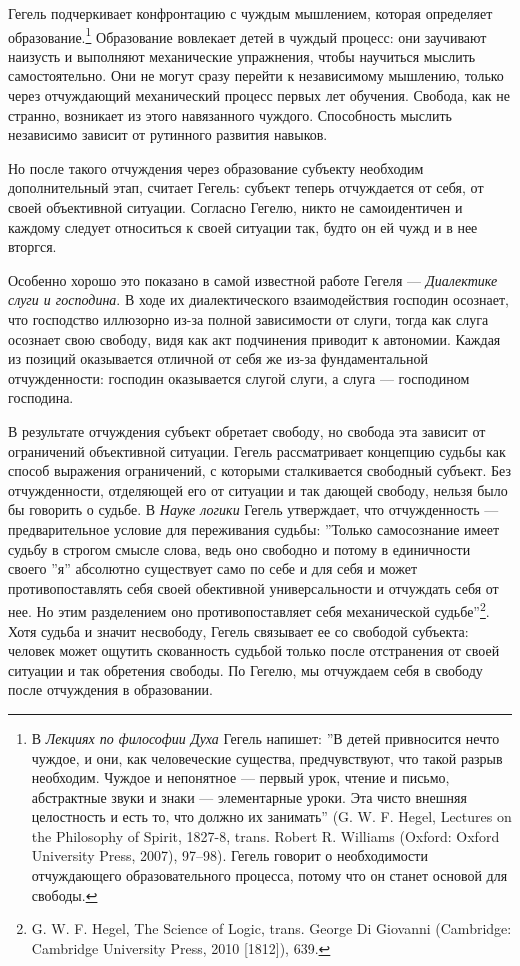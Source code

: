 \documentclass[12pt]{book}
\begin{document}
Гегель подчеркивает конфронтацию с чуждым мышлением, которая определяет образование.\footnote{В \textit{Лекциях по философии Духа} Гегель напишет: ''В детей привносится нечто чуждое, и они, как человеческие существа, предчувствуют, что такой разрыв необходим. Чуждое и непонятное --- первый урок, чтение и письмо, абстрактные звуки и знаки --- элементарные уроки. Эта чисто внешняя целостность и есть то, что должно их занимать'' (G. W. F. Hegel, Lectures on the Philosophy of Spirit, 1827-8, trans. Robert R. Williams (Oxford: Oxford University Press, 2007), 97–98). Гегель говорит о необходимости отчуждающего образовательного процесса, потому что он станет основой для свободы.} Образование вовлекает детей в чуждый процесс: они заучивают наизусть и выполняют механические упражнения, чтобы научиться мыслить самостоятельно. Они не могут сразу перейти к независимому мышлению, только через отчуждающий механический процесс первых лет обучения. Свобода, как не странно, возникает из этого навязанного чуждого. Способность мыслить независимо зависит от рутинного развития навыков.

Но после такого отчуждения через образование субъекту необходим дополнительный этап, считает Гегель: субъект теперь отчуждается от себя, от своей объективной ситуации. Согласно Гегелю, никто не самоидентичен и каждому следует относиться к своей ситуации так, будто он ей чужд и в нее вторгся.

Особенно хорошо это показано в самой известной работе Гегеля --- \textit{Диалектике слуги и господина}. В ходе их диалектического взаимодействия господин осознает, что господство иллюзорно из-за полной зависимости от слуги, тогда как слуга осознает свою свободу, видя как акт подчинения приводит к автономии. Каждая из позиций оказывается отличной от себя же из-за фундаментальной отчужденности: господин оказывается слугой слуги, а слуга --- господином господина.

В результате отчуждения субъект обретает свободу, но свобода эта зависит от ограничений объективной ситуации. Гегель рассматривает концепцию судьбы как способ выражения ограничений, с которыми сталкивается свободный субъект. Без отчужденности, отделяющей его от ситуации и так дающей свободу, нельзя было бы говорить о судьбе. В \textit{Науке логики} Гегель утверждает, что отчужденность --- предварительное условие для переживания судьбы: ''Только самосознание имеет судьбу в строгом смысле слова, ведь оно свободно и потому в единичности своего ''я'' абсолютно существует само по себе и для себя и может противопоставлять себя своей обективной универсальности и отчуждать себя от нее. Но этим разделением оно противопоставляет себя механической судьбе''\footnote{G. W. F. Hegel, The Science of Logic, trans. George Di Giovanni (Cambridge: Cambridge University Press, 2010 [1812]), 639.}. Хотя судьба и значит несвободу, Гегель связывает ее со свободой субъекта: человек может ощутить скованность судьбой только после отстранения от своей ситуации и так обретения свободы. По Гегелю, мы отчуждаем себя в свободу после отчуждения в образовании.
\end{document}
